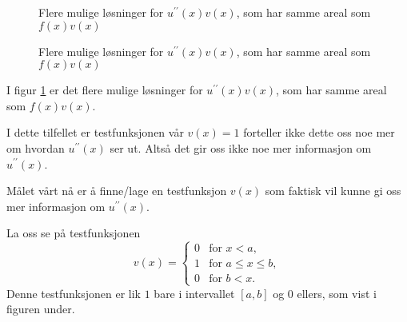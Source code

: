 \begin{figure}[H]
\begin{minipage}{0.48\textwidth}
        \caption{Flere mulige løsninger for $u^{\prime\prime}(x)v(x)$, som har samme areal som $f(x)v(x)$}
    \end{minipage}
    \caption{Flere mulige løsninger for $u^{\prime\prime}(x)v(x)$, som har samme areal som $f(x)v(x)$}
    \label{ex:svak_formulering}
\end{figure}

I figur \ref{ex:svak_formulering} er det flere mulige løsninger for $u^{\prime\prime}(x)v(x)$, som har samme areal som $f(x)v(x)$.

I dette tilfellet er testfunksjonen vår $v(x) = 1$ forteller ikke dette oss noe mer om hvordan $u^{\prime\prime}(x)$ ser ut.
Altså det gir oss ikke noe mer informasjon om $u^{\prime\prime}(x)$.

Målet vårt nå er å finne/lage en testfunksjon $v(x)$ som faktisk vil kunne gi oss mer informasjon om $u^{\prime\prime}(x)$.

La oss se på testfunksjonen
\[
    v(x) =
    \begin{cases}
        0 & \text{for } x < a,           \\
        1 & \text{for } a \leq x \leq b, \\
        0 & \text{for } b < x.
    \end{cases}
\]
Denne testfunksjonen er lik $1$ bare i intervallet $[a,b]$ og $0$ ellers, som vist i figuren under.



